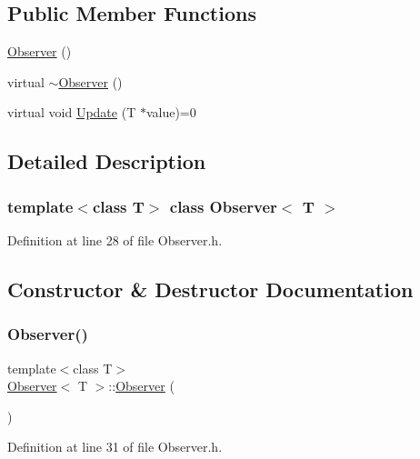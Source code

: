 \subsection*{Public Member Functions}
\begin{DoxyCompactItemize}
\item 
\mbox{\hyperlink{classObserver_a59dd3feed8ad082fd269e2126479c937}{Observer}} ()
\item 
virtual \mbox{\hyperlink{classObserver_a28d160e9d15f30ff1eb6dc856db01e1a}{$\sim$\+Observer}} ()
\item 
virtual void \mbox{\hyperlink{classObserver_a3440221897a56f77975c504b0797c0d5}{Update}} (T $\ast$value)=0
\end{DoxyCompactItemize}


\subsection{Detailed Description}
\subsubsection*{template$<$class T$>$\newline
class Observer$<$ T $>$}



Definition at line 28 of file Observer.\+h.



\subsection{Constructor \& Destructor Documentation}
\mbox{\label{classObserver_a59dd3feed8ad082fd269e2126479c937}} 
\subsubsection{\texorpdfstring{Observer()}{Observer()}}
{\footnotesize\ttfamily template$<$class T$>$ \\
\mbox{\hyperlink{classObserver}{Observer}}$<$ T $>$\+::\mbox{\hyperlink{classObserver}{Observer}} (\begin{DoxyParamCaption}{ }\end{DoxyParamCaption})\hspace{0.3cm}{\ttfamily [inline]}}



Definition at line 31 of file Observer.\+h.


